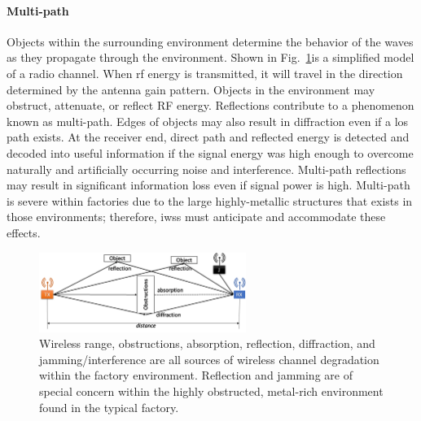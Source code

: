 \paragraph{Multi-path} Objects within the surrounding environment determine the behavior of the waves as they propagate through the environment.  Shown in Fig.~\ref{intro:fig:multipath}is a simplified model of a radio channel. When \gls{rf} energy is transmitted, it will travel in the direction determined by the antenna gain pattern.  Objects in the environment may obstruct, attenuate, or reflect RF energy.  Reflections contribute to a phenomenon known as multi-path.   Edges of objects may also result in diffraction even if a \gls{los} path exists.  At the receiver end, direct path and reflected energy is detected and decoded into useful information if the signal energy was high enough to overcome naturally and artificially occurring noise and interference.  Multi-path reflections may result in significant information loss even if signal power is high.  Multi-path is severe within factories due to the large highly-metallic structures that exists in those environments\cite{Candell2017.NIST1951,Rappaport1991,Remley2008}; therefore, \glspl{iws} must anticipate and accommodate these effects.

\begin{figure}
	\centering
	\includegraphics[width=0.6\textwidth]{chapter-intro/images/multipath}
	\caption{Wireless range, obstructions, absorption, reflection, diffraction, and jamming/interference are all sources of wireless channel degradation within the factory environment. Reflection and jamming are of special concern within the highly obstructed, metal-rich environment found in the typical factory. }
	\label{intro:fig:multipath}
\end{figure}

